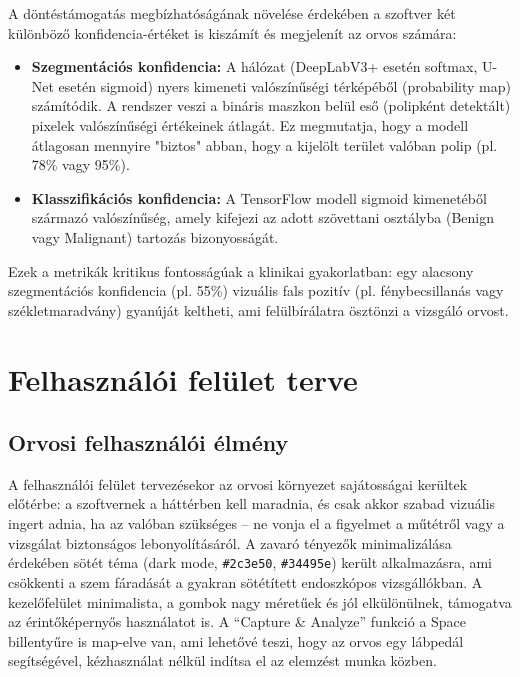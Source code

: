 \documentclass[12pt, a4paper]{report}
\begin{document}
A döntéstámogatás megbízhatóságának növelése érdekében a szoftver két különböző konfidencia-értéket is kiszámít és megjelenít az orvos számára:
\begin{itemize}
    \item \textbf{Szegmentációs konfidencia:} A hálózat (DeepLabV3+ esetén softmax, U-Net esetén sigmoid) nyers kimeneti valószínűségi térképéből (probability map) számítódik. A rendszer veszi a bináris maszkon belül eső (polipként detektált) pixelek valószínűségi értékeinek átlagát. Ez megmutatja, hogy a modell átlagosan mennyire "biztos" abban, hogy a kijelölt terület valóban polip (pl. 78\% vagy 95\%).
    \item \textbf{Klasszifikációs konfidencia:} A TensorFlow modell sigmoid kimenetéből származó valószínűség, amely kifejezi az adott szövettani osztályba (Benign vagy Malignant) tartozás bizonyosságát.
\end{itemize}
Ezek a metrikák kritikus fontosságúak a klinikai gyakorlatban: egy alacsony szegmentációs konfidencia (pl. 55\%) vizuális fals pozitív (pl. fénybecsillanás vagy székletmaradvány) gyanúját keltheti, ami felülbírálatra ösztönzi a vizsgáló orvost.

\section{Felhasználói felület terve}

\subsection{Orvosi felhasználói élmény}
A felhasználói felület tervezésekor az orvosi környezet sajátosságai kerültek előtérbe: a szoftvernek a háttérben kell maradnia, és csak akkor szabad vizuális ingert adnia, ha az valóban szükséges – ne vonja el a figyelmet a műtétről vagy a vizsgálat biztonságos lebonyolításáról. A zavaró tényezők minimalizálása érdekében sötét téma (dark mode, \texttt{\#2c3e50}, \texttt{\#34495e}) került alkalmazásra, ami csökkenti a szem fáradását a gyakran sötétített endoszkópos vizsgállókban. A kezelőfelület minimalista, a gombok nagy méretűek és jól elkülönülnek, támogatva az érintőképernyős használatot is. A ``Capture \& Analyze'' funkció a Space billentyűre is map-elve van, ami lehetővé teszi, hogy az orvos egy lábpedál segítségével, kézhasználat nélkül indítsa el az elemzést munka közben.
\end{document}
